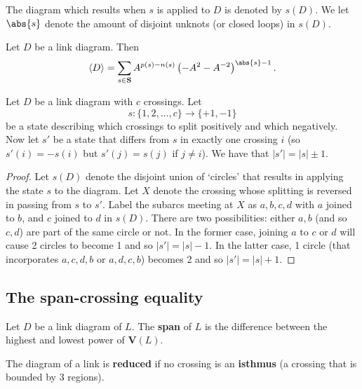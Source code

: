 \documentclass[12pt, a4paper]{article}
\begin{document}
\begin{definition}
    The diagram which results when \(s\) is applied to \(D\) is denoted by \(s(D)\). We let \(\abs{s}\) denote the amount of disjoint unknots (or closed loops) in \(s(D)\).
\end{definition}

\begin{mdprop}
    Let \(D\) be a link diagram. Then 
    \[\langle D \rangle = \sum_{s \in \mathbf{S}} A^{p(s)-n(s)}\left(-A^2-A^{-2}\right)^{\abs{s}-1}.\]
\end{mdprop}

\begin{proposition}
    Let \( D \) be a link diagram with \( c \) crossings. Let
\[
s: \{1, 2, \ldots, c\} \rightarrow \{+1, -1\}
\]
be a state describing which crossings to split positively and which negatively. Now let \( s' \) be a state that differs from \( s \) in exactly one crossing \( i \) (so \( s'(i) = -s(i) \) but \( s'(j) = s(j) \) if \( j \neq i \)). We have that \( |s'| = |s| \pm 1 \).
\end{proposition}

\begin{proof}
    Let \( s(D) \) denote the disjoint union of `circles' that results in applying the state \( s \) to the diagram. Let \( X \) denote the crossing whose splitting is reversed in passing from \( s \) to \( s' \). Label the subarcs meeting at \( X \) as \( a, b, c, d \) with \( a \) joined to \( b \), and \( c \) joined to \( d \) in \( s(D) \). There are two possibilities: either \( a, b \) (and so \( c, d \)) are part of the same circle or not. In the former case, joining \( a \) to \( c \) or \( d \) will cause 2 circles to become 1 and so \( |s'| = |s| - 1 \). In the latter case, 1 circle (that incorporates \( a, c, d, b \) or \( a, d, c, b \)) becomes 2 and so \( |s'| = |s| + 1 \).
\end{proof}

\subsection{The span-crossing equality}

\begin{definition}
    Let \(D\) be a link diagram of \(L\). The \textbf{span} of \(L\) is the difference between the highest and lowest power of \(\bm{V}(L)\).
\end{definition}

\begin{definition}
    The diagram of a link is \textbf{reduced} if no crossing is an \textbf{isthmus} (a crossing that is bounded by \(3\) regions).
\end{definition}
\end{document}
